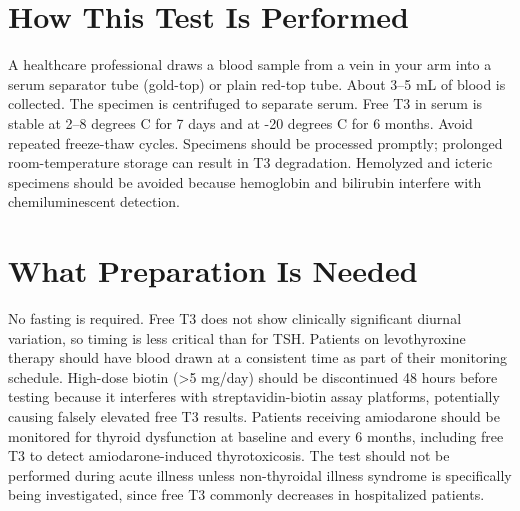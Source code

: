 \section*{How This Test Is Performed}
A healthcare professional draws a blood sample from a vein in your arm into a serum separator tube (gold-top) or plain red-top tube. About 3--5 mL of blood is collected. The specimen is centrifuged to separate serum. Free T3 in serum is stable at 2--8 degrees C for 7 days and at -20 degrees C for 6 months. Avoid repeated freeze-thaw cycles. Specimens should be processed promptly; prolonged room-temperature storage can result in T3 degradation. Hemolyzed and icteric specimens should be avoided because hemoglobin and bilirubin interfere with chemiluminescent detection.

\section*{What Preparation Is Needed}
No fasting is required. Free T3 does not show clinically significant diurnal variation, so timing is less critical than for TSH. Patients on levothyroxine therapy should have blood drawn at a consistent time as part of their monitoring schedule. High-dose biotin (>5 mg/day) should be discontinued 48 hours before testing because it interferes with streptavidin-biotin assay platforms, potentially causing falsely elevated free T3 results. Patients receiving amiodarone should be monitored for thyroid dysfunction at baseline and every 6 months, including free T3 to detect amiodarone-induced thyrotoxicosis. The test should not be performed during acute illness unless non-thyroidal illness syndrome is specifically being investigated, since free T3 commonly decreases in hospitalized patients.

